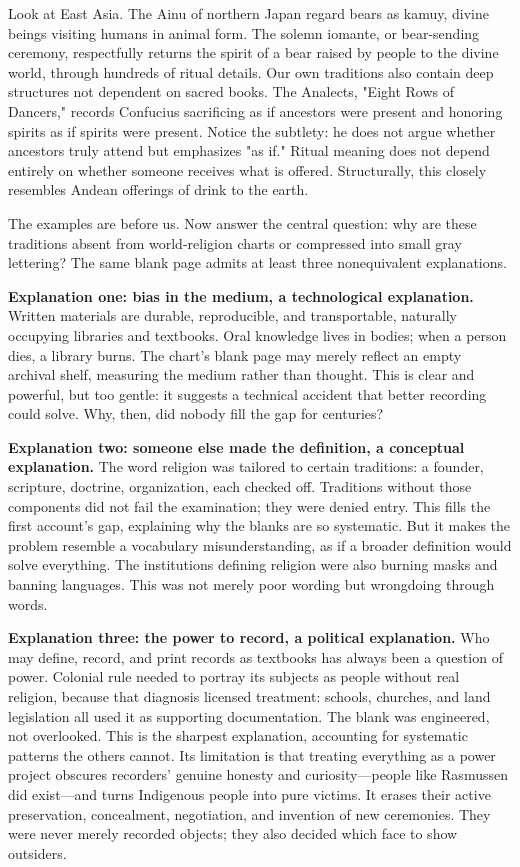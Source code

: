 Look at East Asia. The Ainu of northern Japan regard bears as kamuy, divine beings visiting humans in animal form. The solemn iomante, or bear-sending ceremony, respectfully returns the spirit of a bear raised by people to the divine world, through hundreds of ritual details. Our own traditions also contain deep structures not dependent on sacred books. The Analects, "Eight Rows of Dancers," records Confucius sacrificing as if ancestors were present and honoring spirits as if spirits were present. Notice the subtlety: he does not argue whether ancestors truly attend but emphasizes "as if." Ritual meaning does not depend entirely on whether someone receives what is offered. Structurally, this closely resembles Andean offerings of drink to the earth.

The examples are before us. Now answer the central question: why are these traditions absent from world-religion charts or compressed into small gray lettering? The same blank page admits at least three nonequivalent explanations.

\textbf{Explanation one: bias in the medium, a technological explanation.} Written materials are durable, reproducible, and transportable, naturally occupying libraries and textbooks. Oral knowledge lives in bodies; when a person dies, a library burns. The chart's blank page may merely reflect an empty archival shelf, measuring the medium rather than thought. This is clear and powerful, but too gentle: it suggests a technical accident that better recording could solve. Why, then, did nobody fill the gap for centuries?

\textbf{Explanation two: someone else made the definition, a conceptual explanation.} The word religion was tailored to certain traditions: a founder, scripture, doctrine, organization, each checked off. Traditions without those components did not fail the examination; they were denied entry. This fills the first account's gap, explaining why the blanks are so systematic. But it makes the problem resemble a vocabulary misunderstanding, as if a broader definition would solve everything. The institutions defining religion were also burning masks and banning languages. This was not merely poor wording but wrongdoing through words.

\textbf{Explanation three: the power to record, a political explanation.} Who may define, record, and print records as textbooks has always been a question of power. Colonial rule needed to portray its subjects as people without real religion, because that diagnosis licensed treatment: schools, churches, and land legislation all used it as supporting documentation. The blank was engineered, not overlooked. This is the sharpest explanation, accounting for systematic patterns the others cannot. Its limitation is that treating everything as a power project obscures recorders' genuine honesty and curiosity---people like Rasmussen did exist---and turns Indigenous people into pure victims. It erases their active preservation, concealment, negotiation, and invention of new ceremonies. They were never merely recorded objects; they also decided which face to show outsiders.

